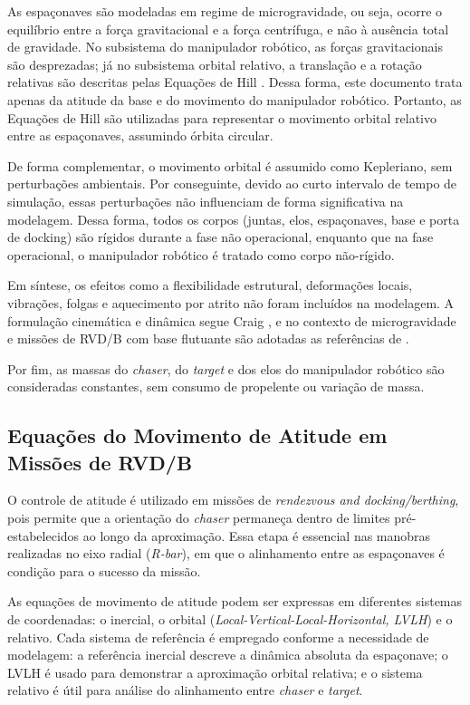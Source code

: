 As espaçonaves são modeladas em regime de microgravidade, ou seja, ocorre o equilíbrio entre a força gravitacional e a força centrífuga, e não à ausência total de gravidade.
No subsistema do manipulador robótico, as forças gravitacionais são desprezadas; já no subsistema orbital relativo, a translação e a rotação relativas são descritas pelas Equações de Hill \cite{hill1878}. Dessa forma, este documento trata apenas da atitude da base e do movimento do manipulador robótico.
Portanto, as Equações de Hill são utilizadas para representar o movimento orbital relativo entre as espaçonaves, assumindo órbita circular.

De forma complementar, o movimento orbital é assumido como Kepleriano, sem perturbações ambientais.
Por conseguinte, devido ao curto intervalo de tempo de simulação, essas perturbações não influenciam de forma significativa na modelagem.
Dessa forma, todos os corpos (juntas, elos, espaçonaves, base e porta de docking) são rígidos durante a fase não operacional, enquanto que na fase operacional, o manipulador robótico é tratado como corpo não-rígido.  

Em síntese, os efeitos como a flexibilidade estrutural, deformações locais, vibrações, folgas e aquecimento por atrito não foram incluídos na modelagem.
A formulação cinemática e dinâmica segue Craig \cite{craig2005}, e no contexto de microgravidade e missões de RVD/B com base flutuante são adotadas as referências de \cite{fehse2003,wie2008space}.

Por fim, as massas do \emph{chaser}, do \emph{target} e dos elos do manipulador robótico são consideradas constantes, sem consumo de propelente ou variação de massa.

\subsection{Equações do Movimento de Atitude em Missões de RVD/B}
O controle de atitude é utilizado em missões de \emph{rendezvous and docking/berthing}, pois permite que a orientação do \emph{chaser} permaneça dentro de limites pré-estabelecidos ao longo da aproximação.
Essa etapa é essencial nas manobras realizadas no eixo radial (\emph{R-bar}), em que o alinhamento entre as espaçonaves é condição para o sucesso da missão.

As equações de movimento de atitude podem ser expressas em diferentes sistemas de coordenadas: o inercial, o orbital (\emph{Local-Vertical-Local-Horizontal, LVLH}) e o relativo.
Cada sistema de referência é empregado conforme a necessidade de modelagem:
a referência inercial descreve a dinâmica absoluta da espaçonave;
o LVLH é usado para demonstrar a aproximação orbital relativa;
e o sistema relativo é útil para análise do alinhamento entre \emph{chaser} e \emph{target}.

